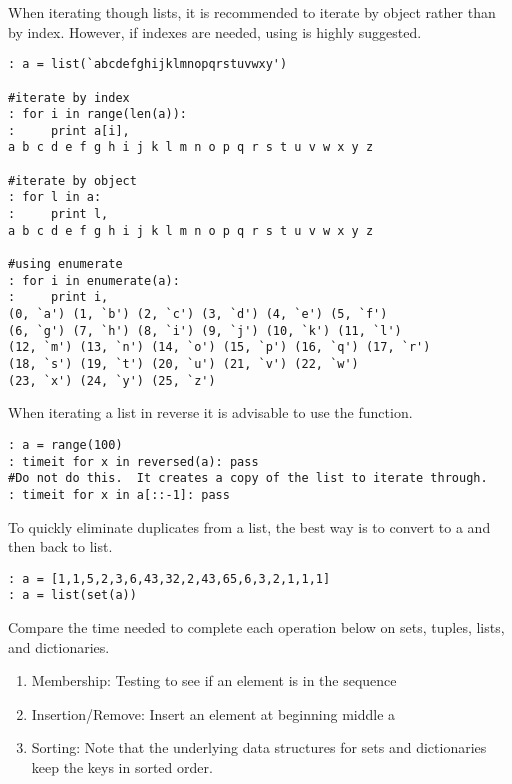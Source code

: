When iterating though lists, it is recommended to iterate by object rather than by index.
However, if indexes are needed, using  is highly suggested.
\begin{lstlisting}
: a = list(`abcdefghijklmnopqrstuvwxy')

#iterate by index
: for i in range(len(a)):
:     print a[i],
a b c d e f g h i j k l m n o p q r s t u v w x y z

#iterate by object
: for l in a:
:     print l,
a b c d e f g h i j k l m n o p q r s t u v w x y z

#using enumerate
: for i in enumerate(a):
:     print i,
(0, `a') (1, `b') (2, `c') (3, `d') (4, `e') (5, `f') 
(6, `g') (7, `h') (8, `i') (9, `j') (10, `k') (11, `l') 
(12, `m') (13, `n') (14, `o') (15, `p') (16, `q') (17, `r') 
(18, `s') (19, `t') (20, `u') (21, `v') (22, `w') 
(23, `x') (24, `y') (25, `z')
\end{lstlisting}

When iterating a list in reverse it is advisable to use the  function.
\begin{lstlisting}
: a = range(100)
: timeit for x in reversed(a): pass
#Do not do this.  It creates a copy of the list to iterate through.
: timeit for x in a[::-1]: pass
\end{lstlisting}

To quickly eliminate duplicates from a list, the best way is to convert to a 
and then back to list.
\begin{lstlisting}
: a = [1,1,5,2,3,6,43,32,2,43,65,6,3,2,1,1,1]
: a = list(set(a))
\end{lstlisting}

\begin{problem}
Compare the time needed to complete each operation below on sets, tuples, lists, and dictionaries.
\begin{enumerate}
\item Membership: Testing to see if an element is in the sequence
\item Insertion/Remove: Insert an element at beginning middle a
\item Sorting: Note that the underlying data structures for sets and dictionaries keep the keys in sorted order.
\end{enumerate}

\end{problem}

